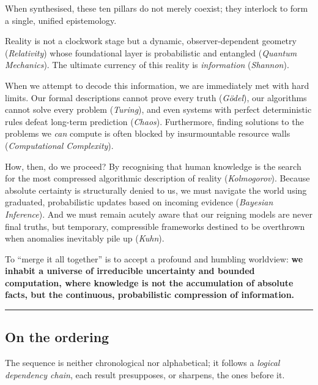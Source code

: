 \documentclass[11pt,a4paper]{article}
\begin{document}
When synthesised, these ten pillars do not merely coexist; they interlock to form a single, unified epistemology. 

Reality is not a clockwork stage but a dynamic, observer-dependent geometry (\emph{Relativity}) whose foundational layer is probabilistic and entangled (\emph{Quantum Mechanics}). The ultimate currency of this reality is \emph{information} (\emph{Shannon}). 

When we attempt to decode this information, we are immediately met with hard limits. Our formal descriptions cannot prove every truth (\emph{G\"odel}), our algorithms cannot solve every problem (\emph{Turing}), and even systems with perfect deterministic rules defeat long-term prediction (\emph{Chaos}). Furthermore, finding solutions to the problems we \emph{can} compute is often blocked by insurmountable resource walls (\emph{Computational Complexity}).

How, then, do we proceed? By recognising that human knowledge is the search for the most compressed algorithmic description of reality (\emph{Kolmogorov}). Because absolute certainty is structurally denied to us, we must navigate the world using graduated, probabilistic updates based on incoming evidence (\emph{Bayesian Inference}). And we must remain acutely aware that our reigning models are never final truths, but temporary, compressible frameworks destined to be overthrown when anomalies inevitably pile up (\emph{Kuhn}).

To ``merge it all together'' is to accept a profound and humbling worldview: \textbf{we inhabit a universe of irreducible uncertainty and bounded computation, where knowledge is not the accumulation of absolute facts, but the continuous, probabilistic compression of information.}

\vspace{2.5em}

\begin{center}
	\color{accent}\rule{0.25\textwidth}{0.6pt}
\end{center}

\newpage

	\subsection*{On the ordering}
	
	The sequence is neither chronological nor alphabetical; it follows a
	\emph{logical dependency chain}, each result presupposes, or sharpens,
	the ones before it.
	
\end{document}
